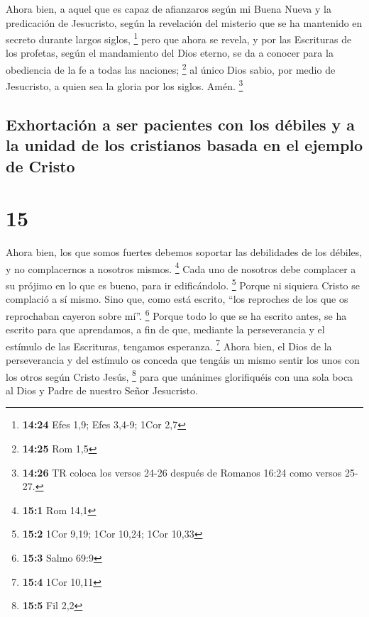  Ahora bien, a aquel que es capaz de afianzaros según mi
Buena Nueva y la predicación de Jesucristo, según la revelación del
misterio que se ha mantenido en secreto durante largos siglos,
\footnote{\textbf{14:24} Efes 1,9; Efes 3,4-9; 1Cor 2,7} 
pero que ahora se revela, y por las Escrituras de los profetas, según el
mandamiento del Dios eterno, se da a conocer para la obediencia de la fe
a todas las naciones; \footnote{\textbf{14:25} Rom 1,5} 
al único Dios sabio, por medio de Jesucristo, a quien sea la gloria por
los siglos. Amén. \footnote{\textbf{14:26} TR coloca los versos 24-26
  después de Romanos 16:24 como versos 25-27.}

\hypertarget{exhortaciuxf3n-a-ser-pacientes-con-los-duxe9biles-y-a-la-unidad-de-los-cristianos-basada-en-el-ejemplo-de-cristo}{%
\subsection{Exhortación a ser pacientes con los débiles y a la unidad de
los cristianos basada en el ejemplo de
Cristo}\label{exhortaciuxf3n-a-ser-pacientes-con-los-duxe9biles-y-a-la-unidad-de-los-cristianos-basada-en-el-ejemplo-de-cristo}}

\hypertarget{section-14}{%
\section{15}\label{section-14}}

 Ahora bien, los que somos fuertes debemos soportar las
debilidades de los débiles, y no complacernos a nosotros mismos.
\footnote{\textbf{15:1} Rom 14,1}  Cada uno de nosotros
debe complacer a su prójimo en lo que es bueno, para ir edificándolo.
\footnote{\textbf{15:2} 1Cor 9,19; 1Cor 10,24; 1Cor 10,33}
 Porque ni siquiera Cristo se complació a sí mismo. Sino
que, como está escrito, ``los reproches de los que os reprochaban
cayeron sobre mí''. \footnote{\textbf{15:3} Salmo 69:9} 
Porque todo lo que se ha escrito antes, se ha escrito para que
aprendamos, a fin de que, mediante la perseverancia y el estímulo de las
Escrituras, tengamos esperanza. \footnote{\textbf{15:4} 1Cor 10,11}
 Ahora bien, el Dios de la perseverancia y del estímulo os
conceda que tengáis un mismo sentir los unos con los otros según Cristo
Jesús, \footnote{\textbf{15:5} Fil 2,2}  para que unánimes
glorifiquéis con una sola boca al Dios y Padre de nuestro Señor
Jesucristo.

